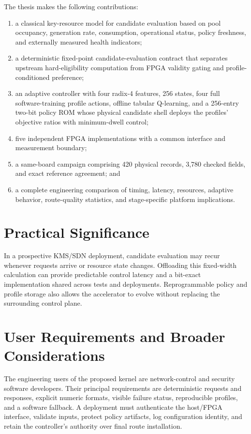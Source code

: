 The thesis makes the following contributions:

\begin{enumerate}
  \item a classical key-resource model for candidate evaluation based on pool
  occupancy, generation rate, consumption, operational status, policy freshness,
  and externally measured health indicators;
  \item a deterministic fixed-point candidate-evaluation contract that separates
  upstream hard-eligibility computation from FPGA validity gating and
  profile-conditioned preference;
  \item an adaptive controller with four radix-4 features, 256 states, four full
  software-training profile actions, offline tabular Q-learning, and a 256-entry
  two-bit policy ROM whose physical candidate shell deploys the profiles' objective
  ratios with minimum-dwell control;
  \item five independent FPGA implementations with a common interface and
  measurement boundary;
  \item a same-board campaign comprising 420 physical records, 3,780 checked fields,
  and exact reference agreement; and
  \item a complete engineering comparison of timing, latency, resources, adaptive
  behavior, route-quality statistics, and stage-specific platform implications.
\end{enumerate}

\section{Practical Significance}

In a prospective KMS/SDN deployment, candidate evaluation may recur whenever
requests arrive or resource state changes. Offloading this fixed-width calculation
can provide predictable control latency and a bit-exact implementation shared across
tests and deployments. Reprogrammable policy and profile storage also allows the
accelerator to evolve without replacing the surrounding control plane.

\section{User Requirements and Broader Considerations}

The engineering users of the proposed kernel are network-control and security
software developers. Their principal requirements are deterministic requests and
responses, explicit numeric formats, visible failure status, reproducible profiles,
and a software fallback. A deployment must authenticate the host/FPGA interface,
validate inputs, protect policy artifacts, log configuration identity, and retain
the controller's authority over final route installation.

